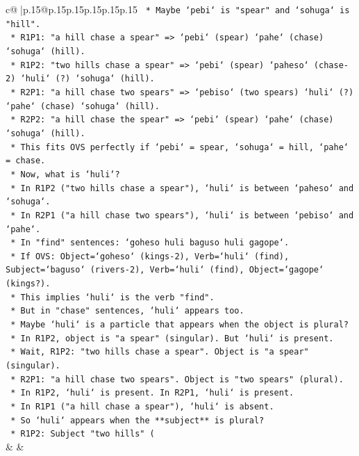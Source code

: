 \documentclass{article}
\begin{document}
{\begin{supertabular}{c@{$\;$}|p{.15\linewidth}@{}p{.15\linewidth}p{.15\linewidth}p{.15\linewidth}p{.15\linewidth}p{.15\linewidth}}
{{{\texttt{            *   Maybe `pebi` is "spear" and `sohuga` is "hill".} \\
\texttt{            *   R1P1: "a hill chase a spear" => `pebi` (spear) `pahe` (chase) `sohuga` (hill).} \\
\texttt{            *   R1P2: "two hills chase a spear" => `pebi` (spear) `paheso` (chase{-}2) `huli` (?) `sohuga` (hill).} \\
\texttt{            *   R2P1: "a hill chase two spears" => `pebiso` (two spears) `huli` (?) `pahe` (chase) `sohuga` (hill).} \\
\texttt{            *   R2P2: "a hill chase the spear" => `pebi` (spear) `pahe` (chase) `sohuga` (hill).} \\
\texttt{            *   This fits OVS perfectly if `pebi` = spear, `sohuga` = hill, `pahe` = chase.} \\
\texttt{            *   Now, what is `huli`?} \\
\texttt{            *   In R1P2 ("two hills chase a spear"), `huli` is between `paheso` and `sohuga`.} \\
\texttt{            *   In R2P1 ("a hill chase two spears"), `huli` is between `pebiso` and `pahe`.} \\
\texttt{            *   In "find" sentences: `goheso huli baguso huli gagope`.} \\
\texttt{                *   If OVS: Object=`goheso` (kings{-}2), Verb=`huli` (find), Subject=`baguso` (rivers{-}2), Verb=`huli` (find), Object=`gagope` (kings?).} \\
\texttt{                *   This implies `huli` is the verb "find".} \\
\texttt{                *   But in "chase" sentences, `huli` appears too.} \\
\texttt{                *   Maybe `huli` is a particle that appears when the object is plural?} \\
\texttt{                *   In R1P2, object is "a spear" (singular). But `huli` is present.} \\
\texttt{                *   Wait, R1P2: "two hills chase a spear". Object is "a spear" (singular).} \\
\texttt{                *   R2P1: "a hill chase two spears". Object is "two spears" (plural).} \\
\texttt{                *   In R1P2, `huli` is present. In R2P1, `huli` is present.} \\
\texttt{                *   In R1P1 ("a hill chase a spear"), `huli` is absent.} \\
\texttt{                *   So `huli` appears when the **subject** is plural?} \\
\texttt{                *   R1P2: Subject "two hills" (} \\
            }
        }
    }
    & & \\ \\


\end{supertabular}}
\end{document}
